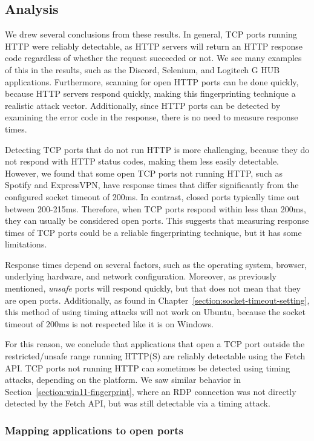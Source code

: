 \subsection{Analysis}

We drew several conclusions from these results. In general, TCP ports running HTTP were reliably detectable, as HTTP servers will return an HTTP response code regardless of whether the request succeeded or not. We see many examples of this in the results, such as the Discord, Selenium, and Logitech G HUB applications. Furthermore, scanning for open HTTP ports can be done quickly, because HTTP servers respond quickly, making this fingerprinting technique a realistic attack vector. Additionally, since HTTP ports can be detected by examining the error code in the response, there is no need to measure response times.

Detecting TCP ports that do not run HTTP is more challenging, because they do not respond with HTTP status codes, making them less easily detectable. However, we found that some open TCP ports not running HTTP, such as Spotify and ExpressVPN, have response times that differ significantly from the configured socket timeout of 200ms. In contrast, closed ports typically time out between 200-215ms. Therefore, when TCP ports respond within less than 200ms, they can usually be considered open ports. This suggests that measuring response times of TCP ports could be a reliable fingerprinting technique, but it has some limitations.

Response times depend on several factors, such as the operating system, browser, underlying hardware, and network configuration. Moreover, as previously mentioned, \emph{unsafe} ports will respond quickly, but that does not mean that they are open ports. Additionally, as found in Chapter~\ref{section:socket-timeout-setting}, this method of using timing attacks will not work on Ubuntu, because the socket timeout of 200ms is not respected like it is on Windows. 

For this reason, we conclude that applications that open a TCP port outside the restricted/unsafe range running HTTP(S) are reliably detectable using the Fetch API. TCP ports not running HTTP can sometimes be detected using timing attacks, depending on the platform. We saw similar behavior in Section~\ref{section:win11-fingerprint}, where an RDP connection was not directly detected by the Fetch API, but was still detectable via a timing attack.

\subsubsection{Mapping applications to open ports}

